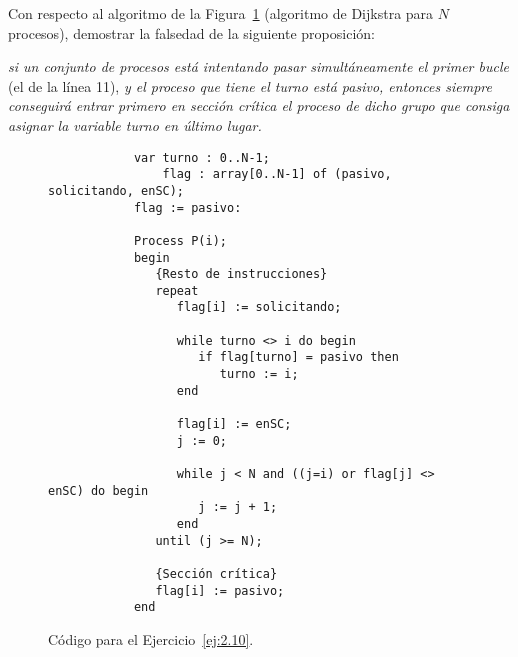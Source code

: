 \begin{ejercicio}\label{ej:2.10}
Con respecto al algoritmo de la Figura~\ref{fig:cod_10} (algoritmo de Dijkstra para $N$ procesos), demostrar la falsedad de la siguiente proposición:\newline

\begin{centering}
\textit{si un conjunto de procesos está intentando pasar simultáneamente el primer bucle} (el de la línea 11), \textit{y el proceso que tiene el turno está pasivo, entonces siempre conseguirá entrar primero en sección crítica el proceso de dicho grupo que consiga asignar la variable turno en último lugar.}
\end{centering}

    \begin{figure}
        \centering
        \begin{verbatim}
            var turno : 0..N-1;
                flag : array[0..N-1] of (pasivo, solicitando, enSC);
            flag := pasivo:

            Process P(i);
            begin
               {Resto de instrucciones}
               repeat
                  flag[i] := solicitando;

                  while turno <> i do begin
                     if flag[turno] = pasivo then 
                        turno := i;
                  end

                  flag[i] := enSC;
                  j := 0;

                  while j < N and ((j=i) or flag[j] <> enSC) do begin
                     j := j + 1;
                  end
               until (j >= N);

               {Sección crítica}
               flag[i] := pasivo;
            end
        \end{verbatim}
        \caption{Código para el Ejercicio~\ref{ej:2.10}.}
        \label{fig:cod_10}
    \end{figure}
    \ \\


\end{ejercicio}
